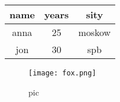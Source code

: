 \documentclass{article}
\begin{document}
\begin{tabular}{|c|c|c|}
\hline
name & years & sity \\
\hline
anna & 25 & moskow \\
\hline
jon & 30 & spb \\
\hline
\end{tabular}



    \begin{figure}[h]
        \centering
        \texttt{[image: fox.png]}
        \caption{pic}
        \label{fig:image}
    \end{figure}
    
\end{document}
